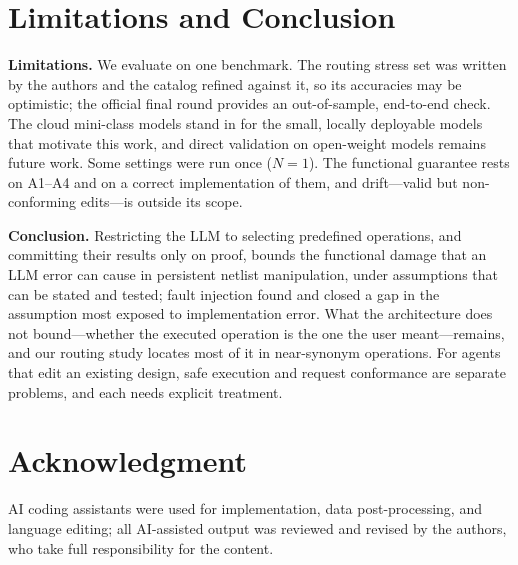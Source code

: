 \documentclass[conference,letterpaper]{IEEEtran}
\begin{document}
\balance
\section{Limitations and Conclusion}
\label{sec:conclusion}

\textbf{Limitations.} We evaluate on one benchmark. The routing stress set was
written by the authors and the catalog refined against it, so its accuracies
may be optimistic; the official final round provides an out-of-sample,
end-to-end check. The cloud mini-class models stand in for the small, locally
deployable models that motivate this work, and direct validation on
open-weight models remains future work. Some settings were run once
($N{=}1$). The functional guarantee rests on A1--A4 and on a correct
implementation of them, and drift---valid but non-conforming edits---is
outside its scope.

\textbf{Conclusion.} Restricting the LLM to selecting predefined operations,
and committing their results only on proof, bounds the functional damage that
an LLM error can cause in persistent netlist manipulation, under assumptions
that can be stated and tested; fault injection found and closed a gap in the
assumption most exposed to implementation error. What the architecture does
not bound---whether the executed operation is the one the user meant---remains,
and our routing study locates most of it in near-synonym operations. For
agents that edit an existing design, safe execution and request conformance
are separate problems, and each needs explicit treatment.

\section*{Acknowledgment}
AI coding assistants were used for implementation, data post-processing, and
language editing; all AI-assisted output was reviewed and revised by the
authors, who take full responsibility for the content.
\end{document}
